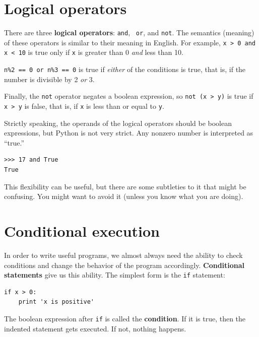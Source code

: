 \documentclass[10pt]{book}
\begin{document}
\section {Logical operators}

There are three {\bf logical operators}: {\tt and}, {\tt
or}, and {\tt not}.  The semantics (meaning) of these operators is
similar to their meaning in English.  For example,
{\tt x > 0 and x < 10} is true only if {\tt x} is greater than 0
{\em and} less than 10.

{\tt n\%2 == 0 or n\%3 == 0} is true if {\em either} of the conditions
is true, that is, if the number is divisible by 2 {\em or} 3.

Finally, the {\tt not} operator negates a boolean
expression, so {\tt not (x > y)} is true if {\tt x > y} is false,
that is, if {\tt x} is less than or equal to {\tt y}.

Strictly speaking, the operands of the logical operators should be
boolean expressions, but Python is not very strict.
Any nonzero number is interpreted as ``true.''

\begin{verbatim}
>>> 17 and True
True
\end{verbatim}
%
This flexibility can be useful, but there are some subtleties to
it that might be confusing.  You might want to avoid it (unless
you know what you are doing).


\section{Conditional execution}
\label{conditional.execution}

In order to write useful programs, we almost always need the ability
to check conditions and change the behavior of the program
accordingly.  {\bf Conditional statements} give us this ability.  The
simplest form is the {\tt if} statement:

\begin{verbatim}
if x > 0:
    print 'x is positive'
\end{verbatim}
%
The boolean expression after {\tt if} is
called the {\bf condition}.  If it is true, then the indented
statement gets executed.  If not, nothing happens.
\end{document}
